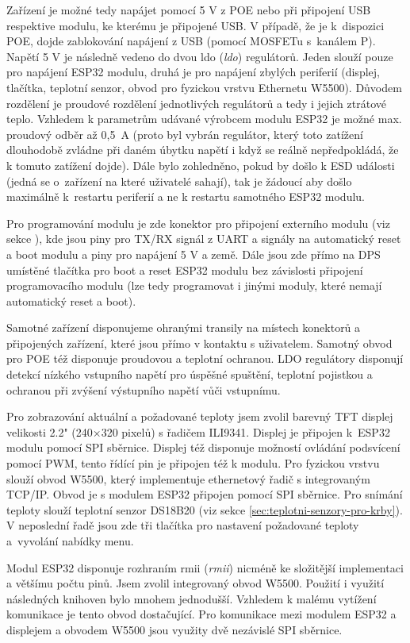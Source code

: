 Zařízení je možné tedy napájet pomocí 5 V z POE nebo při připojení USB respektive modulu, ke kterému je připojené USB. V případě, že je k~dispozici POE, dojde zablokování napájení z USB (pomocí MOSFETu s~kanálem P). Napětí 5 V je následně vedeno do dvou \acrshort{ldo} (\textit{\acrlong{ldo}}) regulátorů. Jeden slouží pouze pro napájení ESP32 modulu, druhá je pro napájení zbylých periferií (displej, tlačítka, teplotní senzor, obvod pro fyzickou vrstvu Ethernetu W5500). Důvodem rozdělení je proudové rozdělení jednotlivých regulátorů a tedy i jejich ztrátové teplo. Vzhledem k parametrům udávané výrobcem modulu ESP32 je možné max. proudový odběr až 0,5~A (proto byl vybrán regulátor, který toto zatížení dlouhodobě zvládne při daném úbytku napětí i když se reálně nepředpokládá, že k tomuto zatížení dojde). Dále bylo zohledněno, pokud by došlo k ESD události (jedná se o~zařízení na které uživatelé sahají), tak je žádoucí aby došlo maximálně k~restartu periferií a ne k restartu samotného ESP32 modulu. 

Pro programování modulu je zde konektor pro připojení externího modulu (viz sekce ), kde jsou piny pro TX/RX signál z UART a signály na automatický reset a boot modulu a piny pro napájení 5 V a země. Dále jsou zde přímo na DPS umístěné tlačítka pro boot a reset ESP32 modulu bez závislosti připojení programovacího modulu (lze tedy programovat i jinými moduly, které nemají automatický reset a boot). 

Samotné zařízení disponujeme ohranými transily na místech konektorů a připojených zařízení, které jsou přímo v kontaktu s uživatelem. Samotný obvod pro POE též disponuje proudovou a teplotní ochranou. LDO regulátory disponují detekcí nízkého vstupního napětí pro úspěšné spuštění, teplotní pojistkou a ochranou při zvýšení výstupního napětí vůči vstupnímu. 

Pro zobrazování aktuální a požadované teploty jsem zvolil barevný TFT displej velikosti 2.2" (240×320 pixelů) s řadičem ILI9341. Displej je připojen k~ESP32 modulu pomocí SPI sběrnice. Displej též disponuje možností ovládání podsvícení pomocí PWM, tento řídící pin je připojen též k modulu. Pro fyzickou vrstvu slouží obvod W5500, který implementuje ethernetový řadič s integrovaným TCP/IP. Obvod je s modulem ESP32 připojen pomocí SPI sběrnice. Pro snímání teploty slouží teplotní senzor DS18B20 (viz sekce \ref{sec:teplotni-senzory-pro-krby}). V neposlední řadě jsou zde tři tlačítka pro nastavení požadované teploty a~vyvolání nabídky menu.

Modul ESP32 disponuje rozhraním \acrshort{rmii} (\textit{\acrlong{rmii}})  nicméně ke složitější implementaci a většímu počtu pinů. Jsem zvolil integrovaný obvod W5500. Použití i využití následných knihoven bylo mnohem jednodušší. Vzhledem k malému vytížení komunikace je tento obvod dostačující. Pro komunikace mezi modulem ESP32 a displejem a obvodem W5500 jsou využity dvě nezávislé SPI sběrnice. 

